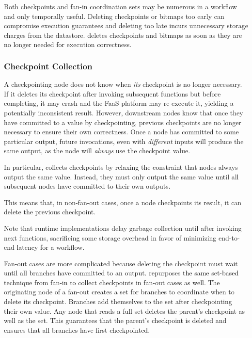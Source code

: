Both checkpoints and fan-in coordination sets may be numerous in a workflow and only
temporally useful. Deleting checkpoints or bitmaps too early can compromise
execution guarantees and deleting too late incurs unnecessary storage charges
from the datastore. \name{} deletes checkpoints and bitmaps as soon as they are
no longer needed for execution correctness.

\subsubsection{Checkpoint Collection}

A checkpointing node does not know when \emph{its} checkpoint is no longer
necessary.  If it deletes its checkpoint after invoking subsequent functions but
before completing, it may crash and the FaaS platform may re-execute it,
yielding a potentially inconsistent result. However, downstream nodes know that
once they have committed to a value by checkpointing, previous checkpoints are
no longer necessary to ensure their own correctness. Once a node has committed
to some particular output, future invocations, even with \emph{different} inputs
will produce the same output, as the node will \emph{always} use the checkpoint
value.

In particular, \name{} collects checkpoints by relaxing the constraint that
nodes always output the same value. Instead, they must only output the same
value until all subsequent nodes have committed to their own outputs.

This means that, in non-fan-out cases, once a node checkpoints its result, it
can delete the previous checkpoint.

Note that \name{} runtime implementations delay garbage collection until after
invoking next functions, sacrificing some storage overhead in favor of
minimizing end-to-end latency for a workflow.

Fan-out cases are more complicated because deleting the checkpoint must wait
until all branches have committed to an output. \name{} repurposes the same
set-based technique from fan-in to collect checkpoints in fan-out cases as well.
The originating node of a fan-out creates a set for branches to coordinate when
to delete its checkpoint. Branches add themselves to the set after checkpointing
their own value. Any node that reads a full set deletes the parent's checkpoint
as well as the set. This guarantees that the parent's checkpoint is deleted and
ensures that all branches have first checkpointed.

